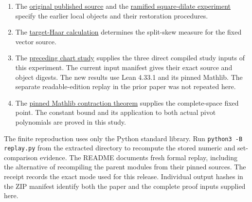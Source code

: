 \documentclass[12pt,letterpaper]{article}
\begin{document}
\begin{enumerate}[leftmargin=1.5em]
\item The \href{https://github.com/nousentllc/riemann-hypothesis/tree/40e56bab026552e089d7afcfeff08d2defb9c005}{original published source} and the \href{https://github.com/nousentllc/riemann-hypothesis/tree/17263859a4d27c62cfc67571737355f61a080806/research/uriel/experiments/ramified-square-dilates}{ramified square-dilate experiment} specify the earlier local objects and their restoration procedures.
\item The \href{https://github.com/nousentllc/riemann-hypothesis/tree/4be022986be0e29b4d38f9d04b17956131fe4d56/research/uriel/experiments/target-four-haar}{target-Haar calculation} determines the split-skew measure for the fixed vector source.
\item The \href{https://github.com/nousentllc/riemann-hypothesis/tree/d69e65e6ac84b552fd7b0f112570904abe2ebdb1/research/uriel/experiments/target-four-regular-chart}{preceding chart study} supplies the three direct compiled study inputs of this experiment. The current input manifest gives their exact source and object digests. The new results use Lean 4.33.1 and its pinned Mathlib. The separate readable-edition replay in the prior paper was not repeated here.
\item The \href{https://github.com/leanprover-community/mathlib4/blob/0df444a360eaa60ab8c11dca51a86af692955474/Mathlib/Topology/MetricSpace/Contracting.lean}{pinned Mathlib contraction theorem} supplies the complete-space fixed point. The constant bound and its application to both actual pivot polynomials are proved in this study.
\end{enumerate}
The finite reproduction uses only the Python standard library. Run \texttt{python3 -B replay.py} from the extracted directory to recompute the stored numeric and set-comparison evidence. The README documents fresh formal replay, including the alternative of recompiling the parent modules from their pinned sources. The receipt records the exact mode used for this release. Individual output hashes in the ZIP manifest identify both the paper and the complete proof inputs supplied here.
\end{document}
